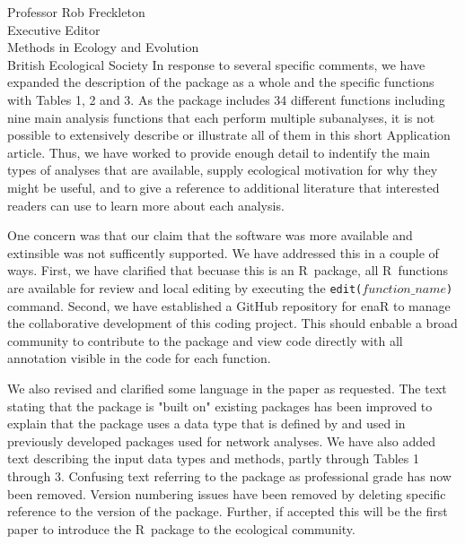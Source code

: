 \documentclass[letter]{letter}
\newcommand{\R}{R}
\begin{document}
\begin{letter}{Professor Rob Freckleton\\
Executive Editor\\
Methods in Ecology and Evolution\\
British Ecological Society
}
In response to several specific comments, we have expanded the
description of the package as a whole and the specific functions with
Tables 1, 2 and 3.  As the package includes 34 different functions
including nine main analysis functions that each perform multiple
subanalyses, it is not possible to extensively describe or illustrate
all of them in this short Application article.  Thus, we have worked
to provide enough detail to indentify the main types of analyses that
are available, supply ecological motivation for why they might be
useful, and to give a reference to additional literature that
interested readers can use to learn more about each analysis.

One concern was that our claim that the software was more available
and extinsible was not sufficently supported.  We have addressed this
in a couple of ways.  First, we have clarified that becuase this is an
\R\ package, all \R\ functions are available for review and local
editing by executing the \texttt{edit($function\_name$)} command.
Second, we have established a GitHub repository for enaR to manage the
collaborative development of this coding project.  This should enbable
a broad community to contribute to the package and view code directly
with all annotation visible in the code for each function.

We also revised and clarified some language in the paper as requested.  The text
stating that the package is "built on" existing packages has been
improved to explain that the package uses a data type that is defined
by and used in previously developed packages used for network analyses. We have
also added text describing the input data types and methods, partly
through Tables 1 through 3. Confusing text referring to the package as
professional grade has now been removed. Version numbering issues have
been removed by deleting specific reference to the version of the
package.  Further, if accepted this will be the first paper to introduce the
\R\ package to the ecological community.


\end{letter}
\end{document}

